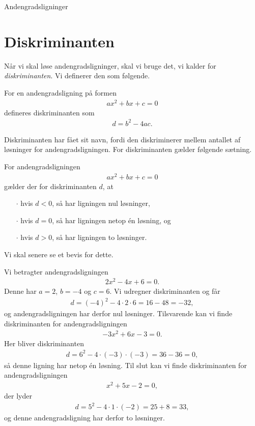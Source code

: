 \begin{center}
\Huge
	Andengradsligninger
\end{center}

\section*{Diskriminanten}

Når vi skal løse andengradsligninger, skal vi bruge det, vi kalder for \textit{diskriminanten}. Vi definerer den som følgende.
\begin{defn}[Diskriminanten]
	For en andengradsligning på formen
	\begin{align*}
		ax^2 + bx + c = 0
	\end{align*}
	defineres diskriminanten som
	\begin{align*}
		d = b^2 - 4ac.
	\end{align*}
\end{defn}
Diskriminanten har fået sit navn, fordi den diskriminerer mellem antallet af løsninger for andengradsligningen. For diskriminanten gælder følgende sætning.
\begin{setn}
	For andengradsligningen
	\begin{align*}
		ax^2 + bx + c = 0
	\end{align*}
	gælder der for diskriminanten $d$, at 
	\begin{itemize}
		\item[$\cdot$] hvis $d < 0$, så har ligningen nul løsninger,
		\item[$\cdot$] hvis $d = 0$, så har ligningen netop én løsning, og 
		\item[$\cdot$] hvis $d > 0$, så har ligningen to løsninger. 
	\end{itemize}
\end{setn}
Vi skal senere se et bevis for dette. 
\begin{exa}
	Vi betragter andengradsligningen
	\begin{align*}
		2x^2 - 4x + 6 = 0.
	\end{align*}
	Denne har $a = 2$, $b = -4$ og $c = 6$. Vi udregner diskriminanten og får
	\begin{align*}
		d = (-4)^2 - 4\cdot 2 \cdot 6 = 16 - 48 = -32, 
	\end{align*}
	og andengradsligningen har derfor nul løsninger. 
	Tilsvarende kan vi finde diskriminanten for andengradsligningen
	\begin{align*}
		-3x^2 + 6x - 3 = 0.
	\end{align*}
	Her bliver diskriminanten
	\begin{align*}
		d = 6^2 - 4\cdot (-3)\cdot (-3) = 36 - 36 = 0,
	\end{align*}
	så denne ligning har netop én løsning. 
	Til slut kan vi finde diskriminanten for andengradsligningen
	\begin{align*}
		x^2 + 5x - 2 = 0,
	\end{align*}
	der lyder
	\begin{align*}
		d = 5^2 - 4\cdot 1 \cdot (-2) = 25 + 8 = 33,
	\end{align*}
	og denne andengradsligning har derfor to løsninger. 
\end{exa}

